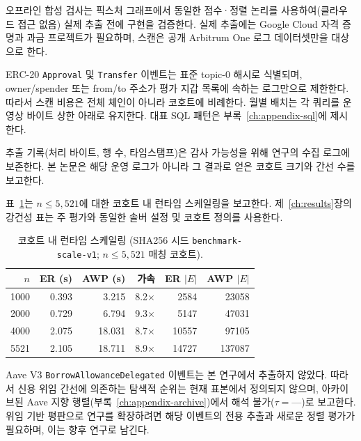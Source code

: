 오프라인 합성 검사는 픽스처 그래프에서 동일한 점수·정렬 논리를 사용하여(클라우드 접근 없음) 실제 추출 전에 구현을 검증한다. 실제 추출에는 Google Cloud 자격 증명과 과금 프로젝트가 필요하며, 스캔은 공개 Arbitrum One 로그 데이터셋만을 대상으로 한다.


ERC-20 \texttt{Approval} 및 \texttt{Transfer} 이벤트는 표준 topic-$0$ 해시로 식별되며, owner/spender 또는 from/to 주소가 평가 지갑 목록에 속하는 로그만으로 제한한다. 따라서 스캔 비용은 전체 체인이 아니라 코호트에 비례한다. 월별 배치는 각 쿼리를 운영상 바이트 상한 아래로 유지한다. 대표 SQL 패턴은 부록~\ref{ch:appendix-sql}에 제시한다.

추출 기록(처리 바이트, 행 수, 타임스탬프)은 감사 가능성을 위해 연구의 수집 로그에 보존한다. 본 논문은 해당 운영 로그가 아니라 그 결과로 얻은 코호트 크기와 간선 수를 보고한다.


표~\ref{tab:benchmark-scaling-incohort}는 $n \leq 5{,}521$에 대한 코호트 내 런타임 스케일링을 보고한다. 제~\ref{ch:results}장의 강건성 표는 주 평가와 동일한 솔버 설정 및 코호트 정의를 사용한다.

\begin{table}[htbp]
\centering
\caption{코호트 내 런타임 스케일링 (SHA256 시드 \texttt{benchmark-scale-v1}; $n \leq 5{,}521$ 매칭 코호트).}
\label{tab:benchmark-scaling-incohort}
\begin{tabular}{rrrrrr}
\toprule
$n$ & ER (s) & AWP (s) & 가속 & ER $|E|$ & AWP $|E|$ \\
\midrule
1000 & 0.393 & 3.215 & 8.2$\times$ & 2584 & 23058 \\
2000 & 0.729 & 6.794 & 9.3$\times$ & 5147 & 47031 \\
4000 & 2.075 & 18.031 & 8.7$\times$ & 10557 & 97105 \\
5521 & 2.105 & 18.711 & 8.9$\times$ & 14727 & 137087 \\
\bottomrule
\end{tabular}
\end{table}


Aave V3 \texttt{BorrowAllowanceDelegated} 이벤트는 본 연구에서 추출하지 않았다. 따라서 신용 위임 간선에 의존하는 탐색적 순위는 현재 표본에서 정의되지 않으며, 아카이브된 Aave 지향 행렬(부록~\ref{ch:appendix-archive})에서 해석 불가($\tau = \text{---}$)로 보고한다. 위임 기반 평판으로 연구를 확장하려면 해당 이벤트의 전용 추출과 새로운 정렬 평가가 필요하며, 이는 향후 연구로 남긴다.


